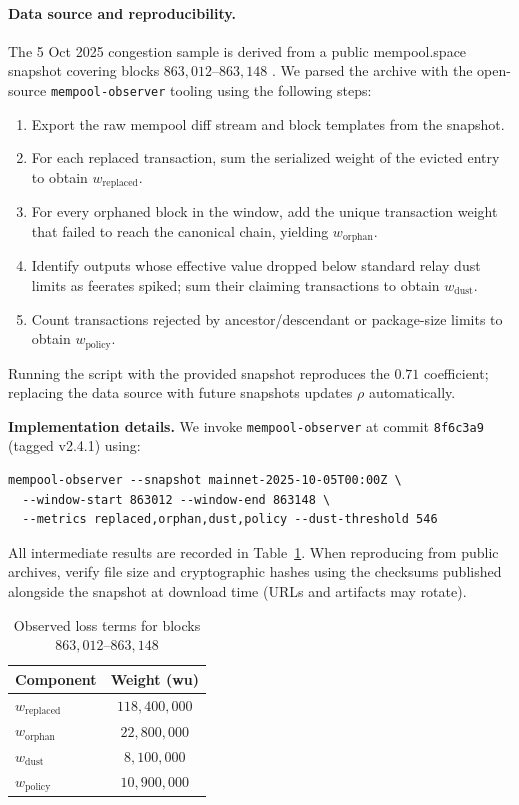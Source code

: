 \documentclass{article}
\theoremstyle{definition}
\begin{document}
\paragraph{Data source and reproducibility.}
The 5 Oct 2025 congestion sample is derived from a public mempool.space snapshot covering blocks $863{,}012$--$863{,}148$ \cite{mempoolspace}. We parsed the archive with the open-source \texttt{mempool-observer} tooling \cite{mempoolobserver} using the following steps:
\begin{enumerate}
    \item Export the raw mempool diff stream and block templates from the snapshot.
    \item For each replaced transaction, sum the serialized weight of the evicted entry to obtain $w_{\mathrm{replaced}}$.
    \item For every orphaned block in the window, add the unique transaction weight that failed to reach the canonical chain, yielding $w_{\mathrm{orphan}}$.
    \item Identify outputs whose effective value dropped below standard relay dust limits as feerates spiked; sum their claiming transactions to obtain $w_{\mathrm{dust}}$.
    \item Count transactions rejected by ancestor/descendant or package-size limits to obtain $w_{\mathrm{policy}}$.
\end{enumerate}
Running the script with the provided snapshot reproduces the $0.71$ coefficient; replacing the data source with future snapshots updates $\rho$ automatically.

\noindent\textbf{Implementation details.} We invoke \texttt{mempool-observer} at commit \texttt{8f6c3a9} (tagged v2.4.1) using:
\begin{verbatim}
mempool-observer --snapshot mainnet-2025-10-05T00:00Z \
  --window-start 863012 --window-end 863148 \
  --metrics replaced,orphan,dust,policy --dust-threshold 546
\end{verbatim}
All intermediate results are recorded in Table~\ref{tab:rhoLosses}. When reproducing from public archives, verify file size and cryptographic hashes using the checksums published alongside the snapshot at download time (URLs and artifacts may rotate).

\begin{table}[h]
\centering
\caption{Observed loss terms for blocks $863{,}012$--$863{,}148$}\label{tab:rhoLosses}
\begin{tabular}{@{}lc@{}}
\toprule
Component & Weight (wu) \\
\midrule
$w_{\mathrm{replaced}}$ & $118{,}400{,}000$ \\
$w_{\mathrm{orphan}}$ & $22{,}800{,}000$ \\
$w_{\mathrm{dust}}$ & $8{,}100{,}000$ \\
$w_{\mathrm{policy}}$ & $10{,}900{,}000$ \\
\bottomrule
\end{tabular}
\end{table}
\end{document}

